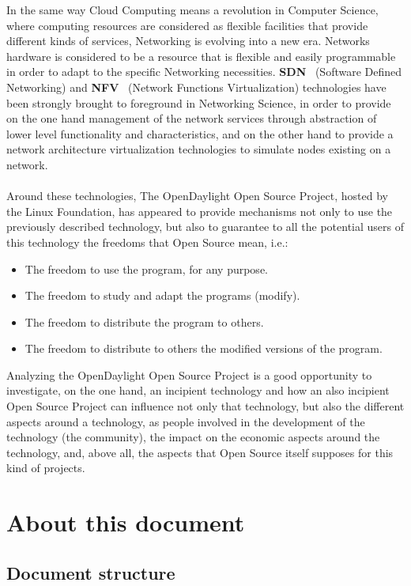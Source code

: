\documentclass[a4paper, 12pt]{book}
\begin{document}
In the same way Cloud Computing means a revolution in Computer Science, where computing resources are considered as flexible facilities that provide different kinds of services, Networking is evolving into a new era. Networks hardware is considered to be a resource that is flexible and easily programmable in order to adapt to the specific Networking necessities. \textbf{SDN}~\cite{OpenNetworkingSDNDefinition} (Software Defined Networking) and \textbf{NFV}~\cite{ETSINFVDefinition} (Network Functions Virtualization) technologies have been strongly brought to foreground in Networking Science, in order to provide on the one hand management of the network services through abstraction of lower level functionality and characteristics, and on the other hand to provide a network architecture virtualization technologies to simulate nodes existing on a network.\\
\\
Around these technologies, The OpenDaylight Open Source Project, hosted by the Linux Foundation, has appeared to provide mechanisms not only to use the previously described technology, but also to guarantee to all the potential users of this technology the freedoms that Open Source mean, i.e.:
\begin{itemize}
 \item The freedom to use the program, for any purpose.
 \item The freedom to study and adapt the programs (modify).
 \item The freedom to distribute the program to others.
 \item The freedom to distribute to others the modified versions of the program.
\end{itemize}
Analyzing the OpenDaylight Open Source Project is a good opportunity to investigate, on the one hand, an incipient technology and how an also incipient Open Source Project can influence not only that technology, but also the different aspects around a technology, as people involved in the development of the technology (the community), the impact on the economic aspects around the technology, and, above all, the aspects that Open Source itself supposes for this kind of projects.

\section{About this document}
\label{sec:about}

\subsection{Document structure}
\end{document}
